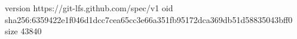 version https://git-lfs.github.com/spec/v1
oid sha256:6359422e1f046d1dcc7cea65cc3e66a351fb95172dca369db51d58835043bff0
size 43840
